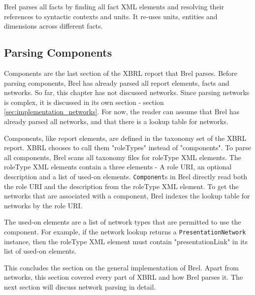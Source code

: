Brel parses all facts by finding all fact XML elements and resolving their references to syntactic contexts and units.
It re-uses units, entities and dimensions across different facts. 

\subsection{Parsing Components}
\label{sec:implementation_components}

Components are the last section of the XBRL report that Brel parses.
Before parsing components, Brel has already parsed all report elements, facts and networks.
So far, this chapter has not discussed networks.
Since parsing networks is complex, it is discussed in its own section - section \ref{sec:implementation_networks}.
For now, the reader can assume that Brel has already parsed all networks, and that there is a lookup table for networks.

Components, like report elements, are defined in the taxonomy set of the XBRL report.
XBRL chooses to call them "roleTypes" instead of "components".
To parse all components, Brel scans all taxonomy files for roleType XML elements.
The roleType XML elements contain a three elements - A role URI, an optional description and a list of used-on elements.
\texttt{Component}s in Brel directly read both the role URI and the description from the roleType XML element.
To get the networks that are associated with a component, Brel indexes the lookup table for networks by the role URI.

The used-on elements are a list of network types that are permitted to use the component.
For example, if the network lookup returns a \texttt{PresentationNetwork} instance, 
then the roleType XML element must contain "presentationLink" in its list of used-on elements.

This concludes the section on the general implementation of Brel.
Apart from networks, this section covered every part of XBRL and how Brel parses it.
The next section will discuss network parsing in detail.

